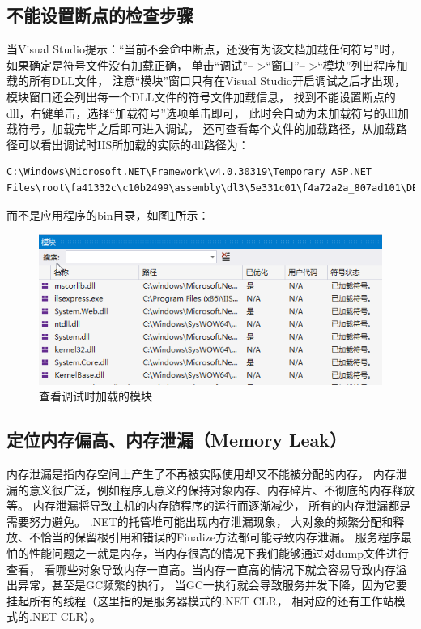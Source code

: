 \documentclass{book}
\begin{document}
\subsection{不能设置断点的检查步骤}

当Visual Studio提示：“当前不会命中断点，还没有为该文档加载任何符号”时，
如果确定是符号文件没有加载正确，
单击“调试”-- >“窗口”-- >“模块”列出程序加载的所有DLL文件，
注意“模块”窗口只有在Visual Studio开启调试之后才出现，
模块窗口还会列出每一个DLL文件的符号文件加载信息，
找到不能设置断点的dll，右键单击，选择“加载符号”选项单击即可，
此时会自动为未加载符号的dll加载符号，加载完毕之后即可进入调试，
还可查看每个文件的加载路径，从加载路径可以看出调试时IIS所加载的实际的dll路径为：	

\begin{lstlisting}
C:\Windows\Microsoft.NET\Framework\v4.0.30319\Temporary ASP.NET Files\root\fa41332c\c10b2499\assembly\dl3\5e331c01\f4a72a2a_807ad101\DBTour.Model.dll
\end{lstlisting}		

而不是应用程序的bin目录，如图\ref{fig:VisualStudioLoadModual}所示：

\begin{figure}[htbp]
	\centering
	\includegraphics[scale=0.8]{VisualStudioLoadModual.png}
	\caption{查看调试时加载的模块}
	\label{fig:VisualStudioLoadModual}
\end{figure}


\subsection{定位内存偏高、内存泄漏（Memory Leak）}

内存泄漏是指内存空间上产生了不再被实际使用却又不能被分配的内存，
内存泄漏的意义很广泛，例如程序无意义的保持对象内存、内存碎片、不彻底的内存释放等。
内存泄漏将导致主机的内存随程序的运行而逐渐减少，
所有的内存泄漏都是需要努力避免。
.NET的托管堆可能出现内存泄漏现象，
大对象的频繁分配和释放、不恰当的保留根引用和错误的Finalize方法都可能导致内存泄漏。
服务程序最怕的性能问题之一就是内存，当内存很高的情况下我们能够通过对dump文件进行查看，
看哪些对象导致内存一直高。当内存一直高的情况下就会容易导致内存溢出异常，甚至是GC频繁的执行，
当GC一执行就会导致服务并发下降，因为它要挂起所有的线程（这里指的是服务器模式的.NET CLR，
相对应的还有工作站模式的.NET CLR）。
\end{document}
